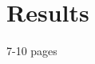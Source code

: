 \documentclass[10pt,a4paper]{scrartcl}
\begin{document}


















\section{Results}
\label{sec:results}
7-10 pages
\end{document}
